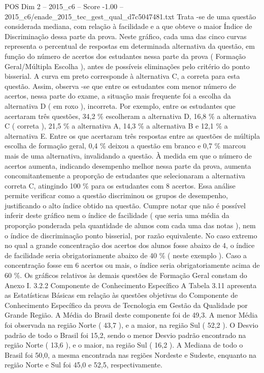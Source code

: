 \begin{textsample}{POS Dim 2 – 2015\_c6 – Score -1.00 – 2015\_c6/enade\_2015\_tec\_gest\_qual\_d7c5047481.txt}
Trata -se de uma questão considerada mediana, com relação à facilidade e a que obteve o maior Índice de Discriminação dessa parte da prova.
Neste gráfico, cada uma das cinco curvas representa o percentual de respostas em determinada alternativa da questão, em função do número de acertos dos estudantes nessa parte da prova ( Formação Geral/Múltipla Escolha ), antes de possíveis eliminações pelo critério do ponto bisserial.
A curva em preto corresponde à alternativa C, a correta para esta questão.
Assim, observa -se que entre os estudantes com menor número de acertos, nessa parte do exame, a situação mais frequente foi a escolha da alternativa D ( em roxo ), incorreta.
Por exemplo, entre os estudantes que acertaram três questões, 34,2 \% escolheram a alternativa D, 16,8 \% a alternativa C ( correta ), 21,5 \% a alternativa A, 14,3 \% a alternativa B e 12,1 \% a alternativa E.
Entre os que acertaram três respostas entre as questões de múltipla escolha de formação geral, 0,4 \% deixou a questão em branco e 0,7 \% marcou mais de uma alternativa, invalidando a questão.
À medida em que o número de acertos aumenta, indicando desempenho melhor nessa parte da prova, aumenta concomitantemente a proporção de estudantes que selecionaram a alternativa correta C, atingindo 100 \% para os estudantes com 8 acertos.
Essa análise permite verificar como a questão discriminou os grupos de desempenho, justificando o alto índice obtido na questão.
Cumpre notar que não é possível inferir deste gráfico nem o índice de facilidade ( que seria uma média da proporção ponderada pela quantidade de alunos com cada uma das notas ), nem o índice de discriminação ponto bisserial, por razão equivalente.
No caso extremo no qual a grande concentração dos acertos dos alunos fosse abaixo de 4, o índice de facilidade seria obrigatoriamente abaixo de 40 \% ( neste exemplo ).
Caso a concentração fosse em 6 acertos ou mais, o índice seria obrigatoriamente acima de 60 \%.
Os gráficos relativos às demais questões de Formação Geral constam do Anexo I. 3.2.2 Componente de Conhecimento Específico A Tabela 3.11 apresenta as Estatísticas Básicas em relação às questões objetivas do Componente de Conhecimento Específico da prova de Tecnologia em Gestão da Qualidade por Grande Região.
A Média do Brasil deste componente foi de 49,3.
A menor Média foi observada na região Norte ( 43,7 ), e a maior, na região Sul ( 52,2 ).
O Desvio padrão de todo o Brasil foi 15,2, sendo o menor Desvio padrão encontrado na região Norte ( 13,6 ), e o maior, na região Sul ( 16,2 ).
A Mediana de todo o Brasil foi 50,0, a mesma encontrada nas regiões Nordeste e Sudeste, enquanto na região Norte e Sul foi 45,0 e 52,5, respectivamente.

\end{textsample}

